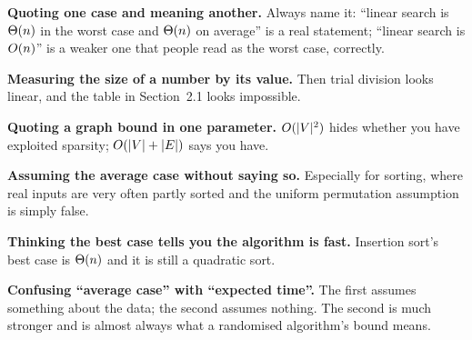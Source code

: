 \begin{pitfall}
\begin{tight}
  \item \textbf{Quoting one case and meaning another.} Always name it: ``linear
        search is $\Theta(n)$ in the worst case and $\Theta(n)$ on average'' is
        a real statement; ``linear search is $O(n)$'' is a weaker one that
        people read as the worst case, correctly.
  \item \textbf{Measuring the size of a number by its value.} Then trial
        division looks linear, and the table in Section~2.1 looks impossible.
  \item \textbf{Quoting a graph bound in one parameter.} $O(|V|^{2})$ hides
        whether you have exploited sparsity; $O(|V| + |E|)$ says you have.
  \item \textbf{Assuming the average case without saying so.} Especially for
        sorting, where real inputs are very often partly sorted and the uniform
        permutation assumption is simply false.
  \item \textbf{Thinking the best case tells you the algorithm is fast.}
        Insertion sort's best case is $\Theta(n)$ and it is still a quadratic
        sort.
  \item \textbf{Confusing ``average case'' with ``expected time''.} The first
        assumes something about the data; the second assumes nothing. The
        second is much stronger and is almost always what a randomised
        algorithm's bound means.
\end{tight}
\end{pitfall}


